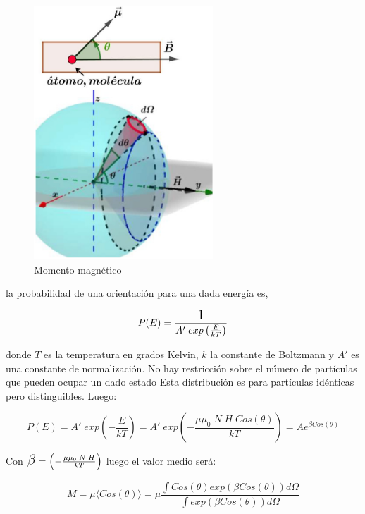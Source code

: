 \begin{figure}[H]
    \centering
    \includegraphics[width=0.6\textwidth]{./Figures/fig_c1}
	\caption{Momento magnético}
	\label{fig:c1}
\end{figure}

la probabilidad de una orientación para una dada energía es, 

\begin{equation}
	P(E)= \dfrac{\Bb{1}}{A'\;exp\left( \frac{E}{kT}\right) }
\end{equation}


donde $T$ es la temperatura en grados Kelvin, $k$ la constante de Boltzmann y $A'$ es una constante de normalización. No hay restricción sobre el número de partículas que pueden ocupar un dado estado Esta distribución es para partículas idénticas pero distinguibles. Luego:

\begin{equation}
	P(E)= A'\;exp\left( -\frac{E}{kT}\right) = A'\;exp\left( -\frac{\mu\mu_{0}\;N\;H\;Cos(\theta)}{kT}\right) = Ae^{\beta Cos(\theta)}
\end{equation}

Con $\Bb{\beta} =\left( -\frac{\mu\mu_{0}\;N\;H}{kT}\right)$ luego el valor medio será:

\begin{equation}
	M=\mu\langle Cos (\theta) \rangle= \mu \dfrac{\int Cos(\theta)exp(\beta Cos(\theta))d\Omega}{\int exp(\beta Cos(\theta))d\Omega}
\end{equation}

